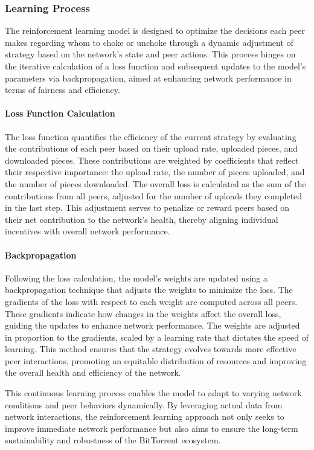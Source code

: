 \documentclass{article}
\begin{document}
\subsubsection{Learning Process}
The reinforcement learning model is designed to optimize the decisions each peer makes regarding whom to choke or unchoke through a dynamic adjustment of strategy based on the network's state and peer actions. This process hinges on the iterative calculation of a loss function and subsequent updates to the model's parameters via backpropagation, aimed at enhancing network performance in terms of fairness and efficiency.

\paragraph{Loss Function Calculation}
The loss function quantifies the efficiency of the current strategy by evaluating the contributions of each peer based on their upload rate, uploaded pieces, and downloaded pieces. These contributions are weighted by coefficients that reflect their respective importance: the upload rate, the number of pieces uploaded, and the number of pieces downloaded. The overall loss is calculated as the sum of the contributions from all peers, adjusted for the number of uploads they completed in the last step. This adjustment serves to penalize or reward peers based on their net contribution to the network's health, thereby aligning individual incentives with overall network performance.

\paragraph{Backpropagation}
Following the loss calculation, the model's weights are updated using a backpropagation technique that adjusts the weights to minimize the loss. The gradients of the loss with respect to each weight are computed across all peers. These gradients indicate how changes in the weights affect the overall loss, guiding the updates to enhance network performance. The weights are adjusted in proportion to the gradients, scaled by a learning rate that dictates the speed of learning. This method ensures that the strategy evolves towards more effective peer interactions, promoting an equitable distribution of resources and improving the overall health and efficiency of the network.

This continuous learning process enables the model to adapt to varying network conditions and peer behaviors dynamically. By leveraging actual data from network interactions, the reinforcement learning approach not only seeks to improve immediate network performance but also aims to ensure the long-term sustainability and robustness of the BitTorrent ecosystem.
\end{document}
